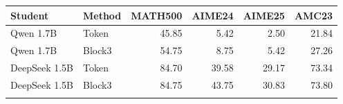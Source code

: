 \begin{tabular}{@{}llrrrr@{}}
\toprule
Student & Method & MATH500 & AIME24 & AIME25 & AMC23 \\
\midrule
Qwen 1.7B & Token & 45.85 & 5.42 & 2.50 & 21.84 \\
Qwen 1.7B & Block3 & 54.75 & 8.75 & 5.42 & 27.26 \\
\addlinespace
DeepSeek 1.5B & Token & 84.70 & 39.58 & 29.17 & 73.34 \\
DeepSeek 1.5B & Block3 & 84.75 & 43.75 & 30.83 & 73.80 \\
\addlinespace
\bottomrule\end{tabular}

